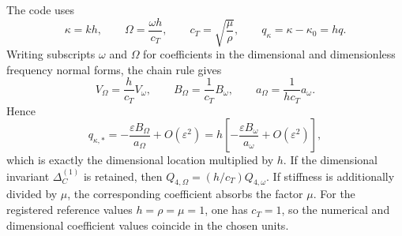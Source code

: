 The code uses
\begin{equation}
  \kappa=kh,
  \qquad
  \Omega=\frac{\omega h}{c_T},
  \qquad
  c_T=\sqrt{\frac{\mu}{\rho}},
  \qquad
  q_\kappa=\kappa-\kappa_0=hq.
  \label{eq:anisotropic-nondimensional-variables}
\end{equation}
Writing subscripts \(\omega\) and \(\Omega\) for coefficients in the
dimensional and dimensionless frequency normal forms, the chain rule gives
\begin{equation}
  V_\Omega=\frac{h}{c_T}V_\omega,
  \qquad
  B_\Omega=\frac{1}{c_T}B_\omega,
  \qquad
  a_\Omega=\frac{1}{hc_T}a_\omega.
  \label{eq:anisotropic-coefficient-conversion}
\end{equation}
Hence
\begin{equation}
  q_{\kappa,*}
  =-\frac{\varepsilon B_\Omega}{a_\Omega}
   +O(\varepsilon^2)
  =h\left[-\frac{\varepsilon B_\omega}{a_\omega}
   +O(\varepsilon^2)\right],
  \label{eq:dimensionless-radial-shift}
\end{equation}
which is exactly the dimensional location multiplied by \(h\).  If the
dimensional invariant \(\Delta_C^{(1)}\) is retained, then
\(Q_{4,\Omega}=(h/c_T)Q_{4,\omega}\).  If stiffness is additionally divided
by \(\mu\), the corresponding coefficient absorbs the factor \(\mu\).
For the registered reference values
\(h=\rho=\mu=1\), one has \(c_T=1\), so the numerical and dimensional
coefficient values coincide in the chosen units.
